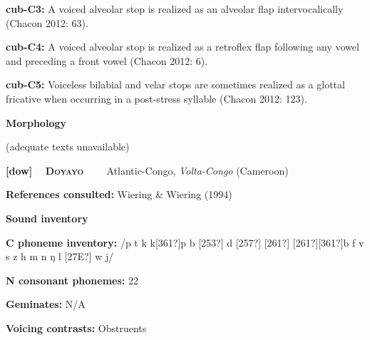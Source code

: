 \begin{styleBody}
\textbf{cub-C3: }A\textbf{ }voiced alveolar stop is realized as an alveolar flap intervocalically (Chacon 2012: 63).
\end{styleBody}

\begin{styleBody}
\textbf{cub-C4: }A voiced alveolar stop is realized as a retroflex flap following any vowel and preceding a front vowel (Chacon 2012: 6).
\end{styleBody}

\begin{styleBody}
\textbf{cub-C5: }Voiceless bilabial and velar stops are sometimes realized as a glottal fricative when occurring in a post-stress syllable (Chacon 2012: 123).
\end{styleBody}

\begin{styleBody}
\textbf{Morphology}
\end{styleBody}

\begin{styleBody}
(adequate texts unavailable)
\end{styleBody}

\clearpage\begin{styleBody}
\textbf{[dow] }\ \ \textbf{\textsc{Doyayo}}\textbf{\ \ \ \ }Atlantic-Congo, \textit{Volta-Congo} (Cameroon)
\end{styleBody}

\begin{styleBody}
\textbf{References consulted: }Wiering \& Wiering (1994)
\end{styleBody}

\begin{styleBody}
\textbf{Sound inventory}
\end{styleBody}

\begin{styleBody}
\textbf{C phoneme inventory:} /p t k k[361?]p b [253?] d [257?] [261?] [261?][361?]b f v s z h m n ŋ l [27E?] w j/
\end{styleBody}

\begin{styleBody}
\textbf{N consonant phonemes:} 22
\end{styleBody}

\begin{styleBody}
\textbf{Geminates:} N/A
\end{styleBody}

\begin{styleBody}
\textbf{Voicing contrasts:} Obstruents
\end{styleBody}

